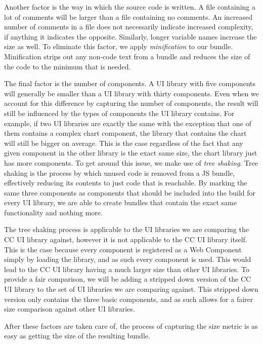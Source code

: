 Another factor is the way in which the source code is written. A file containing a lot of comments will be larger than a file containing no comments. An increased number of comments in a file does not necessarily indicate increased complexity, if anything it indicates the opposite. Similarly, longer variable names increase the size as well. To eliminate this factor, we apply \emph{minification} to our bundle. Minification strips out any non-code text from a bundle and reduces the size of the code to the minimum that is needed.

The final factor is the number of components. A UI library with five components will generally be smaller than a UI library with thirty components. Even when we account for this difference by capturing the number of components, the result will still be influenced by the types of components the UI library contains. For example, if two UI libraries are exactly the same with the exception that one of them contains a complex chart component, the library that contains the chart will still be bigger on average. This is the case regardless of the fact that any given component in the other library is the exact same size, the chart library just has more components. To get around this issue, we make use of \emph{tree shaking}. Tree shaking is the process by which unused code is removed from a JS bundle, effectively reducing its contents to just code that is reachable. By marking the same three components as components that should be included into the build for every UI library, we are able to create bundles that contain the exact same functionality and nothing more.

The tree shaking process is applicable to the UI libraries we are comparing the CC UI library against, however it is not applicable to the CC UI library itself. This is the case because every component is registered as a Web Component simply by loading the library, and as such every component is used. This would lead to the CC UI library having a much larger size than other UI libraries. To provide a fair comparison, we will be adding a stripped down version of the CC UI library to the set of UI libraries we are comparing against. This stripped down version only contains the three basic components, and as such allows for a fairer size comparison against other UI libraries.

After these factors are taken care of, the process of capturing the size metric is as easy as getting the size of the resulting bundle.

